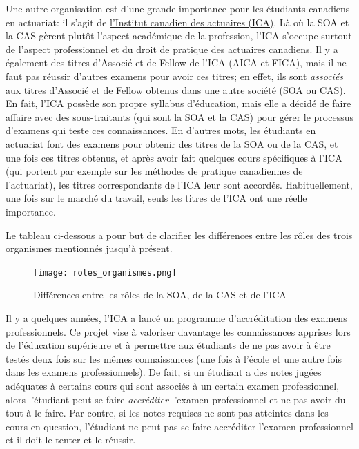 Une autre organisation est d'une grande importance pour les étudiants canadiens en actuariat: il s'agit de \href{https://www.cia-ica.ca/fr/accueil}{l'Institut canadien des actuaires (ICA)}. Là où la SOA et la CAS gèrent plutôt l'aspect académique de la profession, l'ICA s'occupe surtout de l'aspect professionnel et du droit de pratique des actuaires canadiens. Il y a également des titres d'Associé et de Fellow de l'ICA (AICA et FICA), mais il ne faut pas réussir d'autres examens pour avoir ces titres; en effet, ils sont \textit{associés} aux titres d'Associé et de Fellow obtenus dans une autre société (SOA ou CAS). En fait, l'ICA possède son propre syllabus d'éducation, mais elle a décidé de faire affaire avec des sous-traitants (qui sont la SOA et la CAS) pour gérer le processus d'examens qui teste ces connaissances. En d'autres mots, les étudiants en actuariat font des examens pour obtenir des titres de la SOA ou de la CAS, et une fois ces titres obtenus, et après avoir fait quelques cours spécifiques à l'ICA (qui portent par exemple sur les méthodes de pratique canadiennes de l'actuariat), les titres correspondants de l'ICA leur sont accordés. Habituellement, une fois sur le marché du travail, seuls les titres de l'ICA ont une réelle importance. \vspace{\baselineskip} 

Le tableau ci-dessous a pour but de clarifier les différences entre les rôles des trois organismes mentionnés jusqu'à présent.

\begin{center}
\begin{figure}[hp]
\texttt{[image: roles\_organismes.png]}
\caption{Différences entre les rôles de la SOA, de la CAS et de l'ICA}
\end{figure}
\par
\end{center}

Il y a quelques années, l'ICA a lancé un programme d'accréditation des examens professionnels. Ce projet vise à valoriser davantage les connaissances apprises lors de l'éducation supérieure et à permettre aux étudiants de ne pas avoir à être testés deux fois sur les mêmes connaissances (une fois à l'école et une autre fois dans les examens professionnels). De fait, si un étudiant a des notes jugées adéquates à certains cours qui sont associés à un certain examen professionnel, alors l'étudiant peut se faire \textit{accréditer} l'examen professionnel et ne pas avoir du tout à le faire. Par contre, si les notes requises ne sont pas atteintes dans les cours en question, l'étudiant ne peut pas se faire accréditer l'examen professionnel et il doit le tenter et le réussir. \vspace{\baselineskip}

